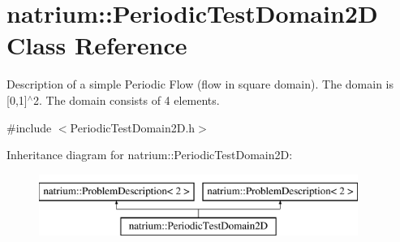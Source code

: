 \hypertarget{classnatrium_1_1PeriodicTestDomain2D}{\section{natrium\-:\-:Periodic\-Test\-Domain2\-D Class Reference}
\label{classnatrium_1_1PeriodicTestDomain2D}
}


Description of a simple Periodic Flow (flow in square domain). The domain is \mbox{[}0,1\mbox{]}$^\wedge$2. The domain consists of 4 elements.  




{\ttfamily \#include $<$Periodic\-Test\-Domain2\-D.\-h$>$}

Inheritance diagram for natrium\-:\-:Periodic\-Test\-Domain2\-D\-:\begin{figure}[H]
\begin{center}
\leavevmode
\includegraphics[height=2.000000cm]{classnatrium_1_1PeriodicTestDomain2D}
\end{center}
\end{figure}
